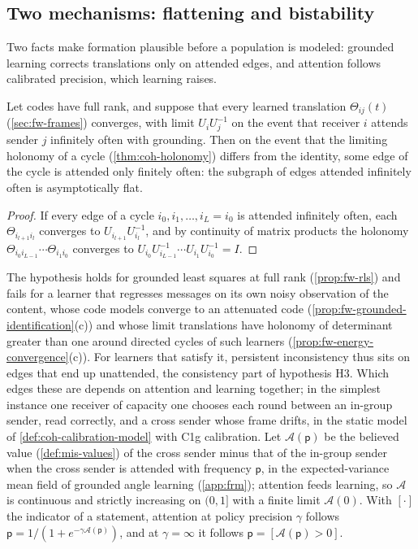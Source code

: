 \subsection{Two mechanisms: flattening and bistability}\label{sec:frm-mechanisms}

Two facts make formation plausible before a population is modeled: grounded learning corrects translations only on attended edges, and attention follows calibrated precision, which learning raises.

\begin{proposition}\label{prop:frm-flattening}
Let codes have full rank, and suppose that every learned translation $\Theta_{ij}(t)$ (\cref{sec:fw-frames}) converges, with limit $U_iU_j^{-1}$ on the event that receiver $i$ attends sender $j$ infinitely often with grounding. Then on the event that the limiting holonomy of a cycle (\cref{thm:coh-holonomy}) differs from the identity, some edge of the cycle is attended only finitely often: the subgraph of edges attended infinitely often is asymptotically flat.
\end{proposition}
\begin{proof}
If every edge of a cycle $i_0,i_1,\dots,i_L=i_0$ is attended infinitely often, each $\Theta_{i_{l+1}i_l}$ converges to $U_{i_{l+1}}U_{i_l}^{-1}$, and by continuity of matrix products the holonomy $\Theta_{i_0i_{L-1}}\cdots\Theta_{i_1i_0}$ converges to $U_{i_0}U_{i_{L-1}}^{-1}\cdots U_{i_1}U_{i_0}^{-1}=I$.
\end{proof}

The hypothesis holds for grounded least squares at full rank (\cref{prop:fw-rls}) and fails for a learner that regresses messages on its own noisy observation of the content, whose code models converge to an attenuated code (\cref{prop:fw-grounded-identification}(c)) and whose limit translations have holonomy of determinant greater than one around directed cycles of such learners (\cref{prop:fw-energy-convergence}(c)). For learners that satisfy it, persistent inconsistency thus sits on edges that end up unattended, the consistency part of hypothesis H3. Which edges these are depends on attention and learning together; in the simplest instance one receiver of capacity one chooses each round between an in-group sender, read correctly, and a cross sender whose frame drifts, in the static model of \cref{def:coh-calibration-model} with C1g calibration. Let $\mathcal A(\mathsf p)$ be the believed value (\cref{def:mis-values}) of the cross sender minus that of the in-group sender when the cross sender is attended with frequency $\mathsf p$, in the expected-variance mean field of grounded angle learning (\cref{app:frm}); attention feeds learning, so $\mathcal A$ is continuous and strictly increasing on $(0,1]$ with a finite limit $\mathcal A(0)$. With $[\cdot]$ the indicator of a statement, attention at policy precision $\gamma$ follows $\mathsf p=1/(1+e^{-\gamma\mathcal A(\mathsf p)})$, and at $\gamma=\infty$ it follows $\mathsf p=[\mathcal A(\mathsf p)>0]$.

